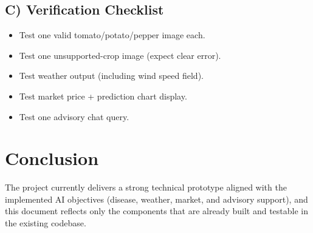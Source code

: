 \documentclass[11pt,a4paper]{article}
\begin{document}
\subsection{C) Verification Checklist}
\begin{itemize}[noitemsep]
  \item Test one valid tomato/potato/pepper image each.
  \item Test one unsupported-crop image (expect clear error).
  \item Test weather output (including wind speed field).
  \item Test market price + prediction chart display.
  \item Test one advisory chat query.
\end{itemize}

\section{Conclusion}
The project currently delivers a strong technical prototype aligned with the implemented AI objectives (disease, weather, market, and advisory support), and this document reflects only the components that are already built and testable in the existing codebase.
\end{document}
